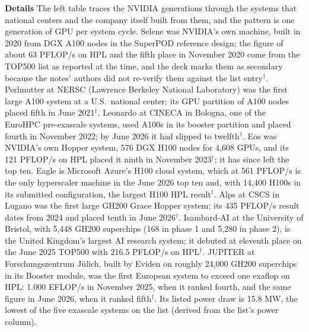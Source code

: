 \documentclass[11pt,letterpaper]{article}
\newcommand{\para}[1]{\medskip\noindent\textbf{#1}\quad}
\begin{document}
\para{Details} The left table traces the NVIDIA generations through the systems that national centers and the company itself built from them, and the pattern is one generation of GPU per system cycle. Selene was NVIDIA's own machine, built in 2020 from DGX A100 nodes in the SuperPOD reference design; the figure of about 63 PFLOP/s on HPL and the fifth place in November 2020 come from the TOP500 list as reported at the time, and the deck marks them as secondary because the notes' authors did not re-verify them against the list entry$^\dagger$. Perlmutter at NERSC (Lawrence Berkeley National Laboratory) was the first large A100 system at a U.S.\ national center; its GPU partition of A100 nodes placed fifth in June 2021$^\dagger$. Leonardo at CINECA in Bologna, one of the EuroHPC pre-exascale systems, used A100s in its booster partition and placed fourth in November 2022; by June 2026 it had slipped to twelfth$^\dagger$. Eos was NVIDIA's own Hopper system, 576 DGX H100 nodes for 4,608 GPUs, and its 121 PFLOP/s on HPL placed it ninth in November 2023$^\dagger$; it has since left the top ten. Eagle is Microsoft Azure's H100 cloud system, which at 561 PFLOP/s is the only hyperscaler machine in the June 2026 top ten and, with 14,400 H100s in its submitted configuration, the largest H100 HPL result$^\dagger$. Alps at CSCS in Lugano was the first large GH200 Grace Hopper system; its 435 PFLOP/s result dates from 2024 and placed tenth in June 2026$^\dagger$. Isambard-AI at the University of Bristol, with 5,448 GH200 superchips (168 in phase 1 and 5,280 in phase 2), is the United Kingdom's largest AI research system; it debuted at eleventh place on the June 2025 TOP500 with 216.5 PFLOP/s on HPL$^\dagger$. JUPITER at Forschungszentrum J\"ulich, built by Eviden on roughly 24,000 GH200 superchips in its Booster module, was the first European system to exceed one exaflop on HPL: 1.000 EFLOP/s in November 2025, when it ranked fourth, and the same figure in June 2026, when it ranked fifth$^\dagger$. Its listed power draw is 15.8 MW, the lowest of the five exascale systems on the list (derived from the list's power column).
\end{document}
